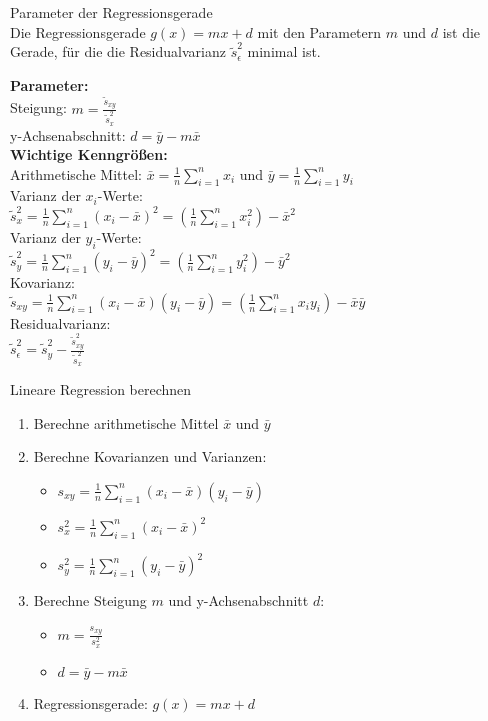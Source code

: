 \begin{theorem}{Parameter der Regressionsgerade}\\
Die Regressionsgerade $g(x) = mx + d$ mit den Parametern $m$ und $d$ ist die Gerade, für die die Residualvarianz $\tilde{s}_\epsilon^2$ minimal ist.

\textbf{Parameter:}\\
Steigung: $m = \frac{\tilde{s}_{xy}}{\tilde{s}_x^2}$\\
y-Achsenabschnitt: $d = \bar{y} - m\bar{x}$\\

\textbf{Wichtige Kenngrößen:}\\
Arithmetische Mittel: $\bar{x} = \frac{1}{n}\sum_{i=1}^n x_i$ und $\bar{y} = \frac{1}{n}\sum_{i=1}^n y_i$\\

Varianz der $x_i$-Werte:\\
$\tilde{s}_x^2 = \frac{1}{n}\sum_{i=1}^n (x_i-\bar{x})^2 = (\frac{1}{n}\sum_{i=1}^n x_i^2) - \bar{x}^2$\\

Varianz der $y_i$-Werte:\\
$\tilde{s}_y^2 = \frac{1}{n}\sum_{i=1}^n (y_i-\bar{y})^2 = (\frac{1}{n}\sum_{i=1}^n y_i^2) - \bar{y}^2$\\

Kovarianz:\\
$\tilde{s}_{xy} = \frac{1}{n}\sum_{i=1}^n (x_i-\bar{x})(y_i-\bar{y}) = (\frac{1}{n}\sum_{i=1}^n x_iy_i) - \bar{x}\bar{y}$\\

Residualvarianz:\\
$\tilde{s}_\epsilon^2 = \tilde{s}_y^2 - \frac{\tilde{s}_{xy}^2}{\tilde{s}_x^2}$\\
\end{theorem}

\begin{KR}{Lineare Regression berechnen}
\begin{enumerate}
  \setlength{\itemsep}{1pt}
\item Berechne arithmetische Mittel $\bar{x}$ und $\bar{y}$
\item Berechne Kovarianzen und Varianzen:
   \begin{itemize}
    \setlength{\itemsep}{1pt}
     \item $s_{xy} = \frac{1}{n}\sum_{i=1}^n (x_i-\bar{x})(y_i-\bar{y})$
     \item $s_x^2 = \frac{1}{n}\sum_{i=1}^n (x_i-\bar{x})^2$
     \item $s_y^2 = \frac{1}{n}\sum_{i=1}^n (y_i-\bar{y})^2$
   \end{itemize}
\item Berechne Steigung $m$ und y-Achsenabschnitt $d$:
   \begin{itemize}
     \item $m = \frac{s_{xy}}{s_x^2}$
     \item $d = \bar{y} - m\bar{x}$
   \end{itemize}
\item Regressionsgerade: $g(x) = mx + d$
\end{enumerate}
\end{KR}


